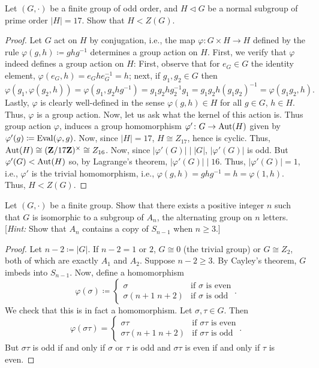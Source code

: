 \begin{problem}
Let $(G,\cdot)$ be a finite group of odd order, and $H\lhd G$ be a normal
subgroup of prime order $|H|=17$. Show that $H<Z(G)$.
\end{problem}
\begin{proof}
Let $G$ act on $H$ by conjugation, i.e., the map $\varphi\colon G\times
H\to H$ defined by the rule $\varphi(g,h)\coloneqq ghg^{-1}$ determines a
group action on $H$. First, we verify that $\varphi$ indeed defines a group
action on $H$: First, observe that for $e_G\in G$ the identity element,
$\varphi(e_G,h)=e_Ghe_G^{-1}=h$; next, if $g_1,g_2\in G$ then
\[
\varphi(g_1,\varphi(g_2,h))=\varphi(g_1,g_2hg^{-1})=g_1g_2hg_2^{-1}g_1=g_1g_2h(g_1g_2)^{-1}=\varphi(g_1g_2,h).
\]
Lastly, $\varphi$ is clearly well-defined in the sense $\varphi(g,h)\in H$
for all $g\in G$, $h\in H$. Thus, $\varphi$ is a group action. Now, let us
ask what the kernel of this action is. Thus group action $\varphi$, induces
a group homomorphism $\varphi'\colon G\to\operatorname{Aut}(H)$ given by
$\varphi'(g)\coloneqq\operatorname{Eval}(\varphi,g)$. Now, since $|H|=17$, $H\cong
Z_{17}$, hence is cyclic. Thus, $\operatorname{Aut}(H)\cong(\mathbf{Z}/17\mathbf{Z})^{\times}\cong
Z_{16}$. Now, since $|\varphi'(G)|\mid |G|$, $|\varphi'(G)|$ is odd. But
$\varphi'(G)<\operatorname{Aut}(H)$ so, by Lagrange's theorem, $|\varphi'(G)|\mid
16$. Thus, $|\varphi'(G)|=1$, i.e., $\varphi'$ is the trivial homomorphism,
i.e., $\varphi(g,h)=ghg^{-1}=h=\varphi(1,h)$. Thus, $H<Z(G)$.
\end{proof}
\begin{problem}
Let $(G,\cdot)$ be a finite group. Show that there exists a positive
integer $n$ such that $G$ is isomorphic to a subgroup of $A_n$, the
alternating group on $n$ letters. [\emph{Hint:} Show that $A_n$ contains a
copy of $S_{n-1}$ when $n\geq 3$.]
\end{problem}
\begin{proof}
Let $n-2\coloneqq |G|$. If $n-2=1$ or $2$, $G\cong 0$ (the trivial group) or
$G\cong Z_2$, both of which are exactly $A_1$ and $A_2$. Suppose $n-2\geq
3$. By Cayley's theorem, $G$ imbeds into $S_{n-1}$. Now, define a
homomorphism
\[
\varphi(\sigma)\coloneqq
\begin{cases}
\sigma&\text{if $\sigma$ is even}\\
\sigma(n+1\;n+2)&\text{if $\sigma$ is odd}
\end{cases}.
\]
We check that this is in fact a homomorphism. Let $\sigma,\tau\in G$. Then
\[
\varphi(\sigma\tau)=
\begin{cases}
\sigma\tau&\text{if $\sigma\tau$ is even}\\
\sigma\tau(n+1\;n+2)&\text{if $\sigma\tau$ is odd}
\end{cases}.
\]
But $\sigma\tau$ is odd if and only if $\sigma$ or $\tau$ is odd and
$\sigma\tau$ is even if and only if $\tau$ is even.
\end{proof}
